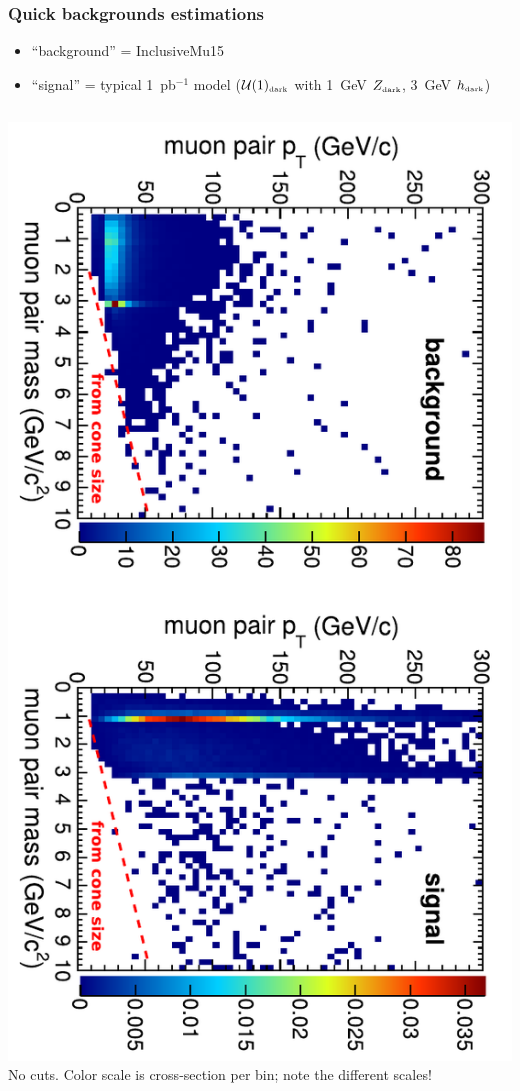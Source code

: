 \documentclass[compress]{beamer}
\begin{document}
\begin{frame}
\frametitle{Quick backgrounds estimations}
\begin{itemize}
\item ``background'' = InclusiveMu15
\item ``signal'' = typical 1~pb$^{-1}$ model {\scriptsize ($\mathcal{U}(1)_{\mbox{\tiny dark}}$ with 1~GeV $Z_{\mbox{\tiny dark}}$, 3~GeV $h_{\mbox{\tiny dark}}$)}
\end{itemize}

\begin{columns}
\includegraphics[height=\linewidth, angle=90]{backgrounds_basic.pdf}
No cuts.  Color scale is cross-section per bin; note the different scales!
\end{columns}


\end{frame}
\end{document}
